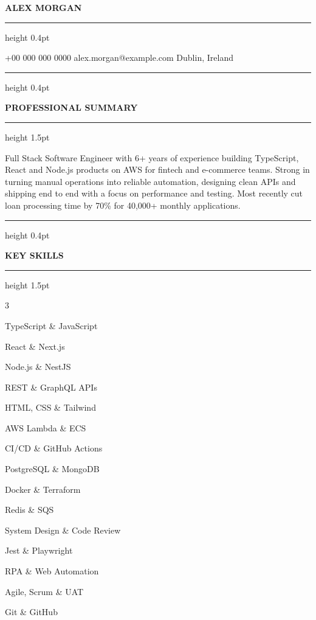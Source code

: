 \documentclass[a4paper,10pt]{article}
\newcommand{\bodyfont}{\fontsize{10.6}{13.1}\selectfont}
\newcommand{\Cap}[1]{{\fontsize{12}{13}\selectfont #1}}
\newcommand{\NameCap}[1]{{\fontsize{18}{20}\selectfont #1}}
\newcommand{\rsection}[1]{%
  \par\vspace{7pt}%
  {\color{textblack}\hrule height 0.4pt}%
  \vspace{3.5pt}%
  \centerline{\bfseries\fontsize{9.5}{13}\selectfont\MakeUppercase{#1}}%
  \vspace{2.5pt}%
  {\color{textblack}\hrule height 1.5pt}%
  \vspace{7pt}%
  \bodyfont
}
\begin{document}
\justifying
\setlength{\parindent}{0pt}

\begin{center}
  {\bfseries\fontsize{14.5}{20}\selectfont\pdfinterwordspaceoff\MakeUppercase{\NameCap{A}lex\pdffakespace{} \NameCap{M}organ}}\pdfinterwordspaceon
\end{center}
\vspace{-4pt}
{\color{textblack}\hrule height 0.4pt}
\vspace{4pt}
\begin{center}
  {\fontsize{10}{12}\selectfont +00 000 000 0000 \textbar{} alex.morgan@example.com \textbar{} Dublin, Ireland}
\end{center}
\vspace{-2pt}

\rsection{\Cap{P}rofessional \Cap{S}ummary}
{\fontsize{10.6}{15}\selectfont
\frenchspacing
Full Stack Software Engineer with 6+ years of experience building TypeScript, React and Node.js products on AWS for fintech and e-commerce teams. Strong in turning manual operations into reliable automation, designing clean APIs and shipping end to end with a focus on performance and testing. Most recently cut loan processing time by 70\% for 40,000+ monthly applications.\par}

\rsection{\Cap{K}ey \Cap{S}kills}
\begin{paracol}{3}
\begin{skilllist}
\raggedright
  \item TypeScript \& JavaScript
  \item React \& Next.js
  \item Node.js \& NestJS
  \item REST \& GraphQL APIs
  \item HTML, CSS \& Tailwind
\end{skilllist}
\switchcolumn
\begin{skilllist}
\raggedright
  \item AWS Lambda \& ECS
  \item CI/CD \& GitHub Actions
  \item PostgreSQL \& MongoDB
  \item Docker \& Terraform
  \item Redis \& SQS
\end{skilllist}
\switchcolumn
\begin{skilllist}
\raggedright
  \item System Design \& Code Review
  \item Jest \& Playwright
  \item RPA \& Web Automation
  \item Agile, Scrum \& UAT
  \item Git \& GitHub
\end{skilllist}
\end{paracol}
\end{document}
